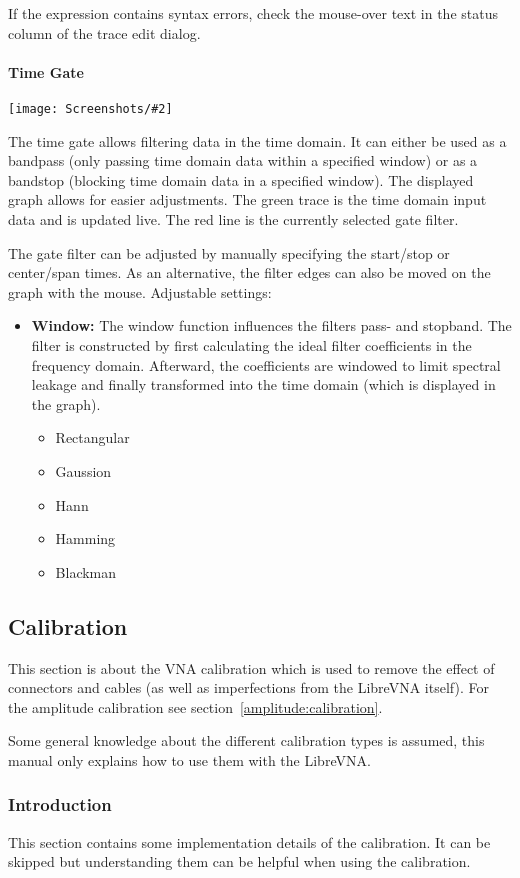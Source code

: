 \documentclass[a4paper,11pt]{article}
\newcommand{\vna}{LibreVNA}
\newcommand{\screenshot}[2]{\begin{center}
\texttt{[image: Screenshots/\#2]}
\end{center}}
\begin{document}
If the expression contains syntax errors, check the mouse-over text in the status column of the trace edit dialog.
\paragraph{Time Gate}
\screenshot{1.0}{MathOpTimeGate.png}
The time gate allows filtering data in the time domain. It can either be used as a bandpass (only passing time domain data within a specified window) or as a bandstop (blocking time domain data in a specified window). The displayed graph allows for easier adjustments. The green trace is the time domain input data and is updated live. The red line is the currently selected gate filter.

The gate filter can be adjusted by manually specifying the start/stop or center/span times. As an alternative, the filter edges can also be moved on the graph with the mouse.
Adjustable settings:
\begin{itemize}
\item \textbf{Window:} The window function influences the filters pass- and stopband. The filter is constructed by first calculating the ideal filter coefficients in the frequency domain. Afterward, the coefficients are windowed to limit spectral leakage and finally transformed into the time domain (which is displayed in the graph).
\begin{itemize}
\item Rectangular
\item Gaussion
\item Hann
\item Hamming
\item Blackman
\end{itemize}
\end{itemize}

\subsection{Calibration}
\label{vna:calibration}
This section is about the VNA calibration which is used to remove the effect of connectors and cables (as well as imperfections from the \vna{} itself). For the amplitude calibration see section~\ref{amplitude:calibration}.

Some general knowledge about the different calibration types is assumed, this manual only explains how to use them with the \vna{}.
\subsubsection{Introduction}
This section contains some implementation details of the calibration. It can be skipped but understanding them can be helpful when using the calibration.
\end{document}
